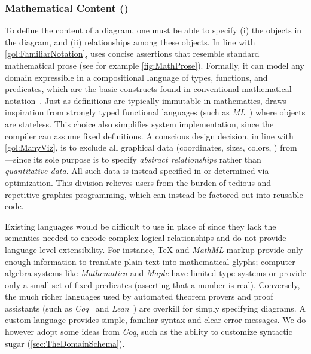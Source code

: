 \subsubsection{Mathematical Content (\Substance{})}
\label{sec:MathematicalContent}

To define the content of a diagram, one must be able to specify (i) the objects in the diagram, and (ii) relationships among these objects.  In line with \ref{gol:FamiliarNotation}, \Substance{} uses concise assertions that resemble standard mathematical prose (see for example \cref{fig:MathProse}).  Formally, it can model any domain expressible in a compositional language of types, functions, and predicates, which are the basic constructs found in conventional mathematical notation~\cite{ganesalingam2013language}.  Just as definitions are typically immutable in mathematics, \Substance{} draws inspiration from strongly typed functional languages (such as \emph{ML}~\cite{Milner:1997:DSM}) where objects are stateless.  This choice also simplifies system implementation, since the compiler can assume fixed definitions.  %
A conscious design decision, in line with \ref{gol:ManyViz}, is to exclude all graphical data (coordinates, sizes, colors, \etc{}) from \Substance{}---since its sole purpose is to specify \emph{abstract relationships} rather than \emph{quantitative data}.  All such data is instead specified in \Style{} or determined via optimization.  This division relieves users from the burden of tedious and repetitive graphics programming, which can instead be factored out into reusable \Style{} code.

Existing languages would be difficult to use in place of \Substance{} since they lack the semantics needed to encode complex logical relationships and do not provide language-level extensibility.  For instance, \TeX{} \cite{Beeton:2016:CMT} and \emph{MathML} \cite{Miner:2005:IMM} markup provide only enough information to translate plain text into mathematical glyphs; computer algebra systems like \emph{Mathematica} and \emph{Maple} have limited type systems or provide only a small set of fixed predicates (\eg asserting that a number is real).  Conversely, the much richer languages used by automated theorem provers and proof assistants (such as \emph{Coq}~\cite{Bertot:2013:ITP} and \emph{Lean}~\cite{deMoura:2015:LTP}) are overkill for simply specifying diagrams. A custom language provides simple, familiar syntax and clear error messages.  We do however adopt some ideas from \emph{Coq}, such as the ability to customize syntactic sugar (\cref{sec:TheDomainSchema}).

